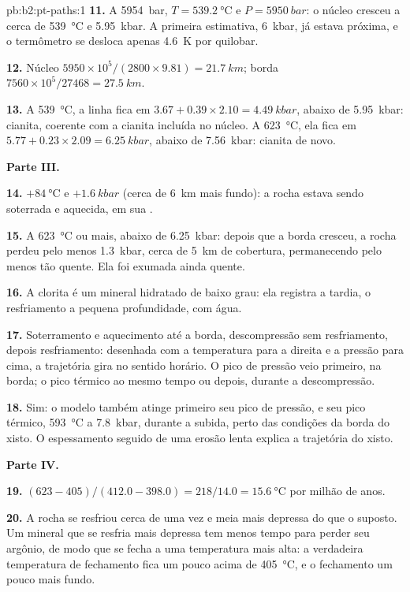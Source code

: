 \begin{solution}{pb:b2:pt-paths:1}
\textbf{11.} A \qty{5954}{bar}, $T = \qty{539.2}{\celsius}$ e $P = \qty{5950}{bar}$: o
núcleo cresceu a cerca de \qty{539}{\celsius} e \qty{5.95}{kbar}. A primeira estimativa,
\qty{6}{kbar}, já estava próxima, e o termômetro se desloca apenas \qty{4.6}{K} por quilobar.

\textbf{12.} Núcleo $5950\times10^5/(2800\times9.81) = \qty{21.7}{km}$; borda
$7560\times10^5/27468 = \qty{27.5}{km}$.

\textbf{13.} A \qty{539}{\celsius}, a linha fica em $3.67 + 0.39\times2.10 =
\qty{4.49}{kbar}$, abaixo de \qty{5.95}{kbar}: cianita, coerente com a cianita incluída
no núcleo. A \qty{623}{\celsius}, ela fica em $5.77 + 0.23\times2.09 = \qty{6.25}{kbar}$,
abaixo de \qty{7.56}{kbar}: cianita de novo.

\noindent\textbf{Parte III.}

\textbf{14.} $+\qty{84}{\celsius}$ e $+\qty{1.6}{kbar}$ (cerca de \qty{6}{km} mais fundo): a
rocha estava sendo soterrada e aquecida, em sua .

\textbf{15.} A \qty{623}{\celsius} ou mais, abaixo de \qty{6.25}{kbar}: depois que a borda cresceu, a
rocha perdeu pelo menos \qty{1.3}{kbar}, cerca de \qty{5}{km} de cobertura, permanecendo pelo
menos tão quente. Ela foi exumada ainda quente.

\textbf{16.} A clorita é um mineral hidratado de baixo grau: ela registra a  tardia, o resfriamento a pequena profundidade, com água.

\textbf{17.} Soterramento e aquecimento até a borda, descompressão sem resfriamento, depois resfriamento:
desenhada com a temperatura para a direita e a pressão para cima, a trajetória gira no sentido horário. O
pico de pressão veio primeiro, na borda; o pico térmico ao mesmo tempo ou depois, durante a
descompressão.

\textbf{18.} Sim: o modelo também atinge primeiro seu pico de pressão, e seu pico térmico,
\qty{593}{\celsius} a \qty{7.8}{kbar}, durante a subida, perto das condições da borda
do xisto. O espessamento seguido de uma erosão lenta explica a trajetória do xisto.

\noindent\textbf{Parte IV.}

\textbf{19.} $(623 - 405)/(412.0 - 398.0) = 218/14.0 = \qty{15.6}{\celsius}$ por milhão
de anos.

\textbf{20.} A rocha se resfriou cerca de uma vez e meia mais depressa do que o suposto. Um mineral
que se resfria mais depressa tem menos tempo para perder seu argônio, de modo que se fecha a uma temperatura mais alta:
a verdadeira temperatura de fechamento fica um pouco acima de \qty{405}{\celsius}, e o fechamento
um pouco mais fundo.


\end{solution}
